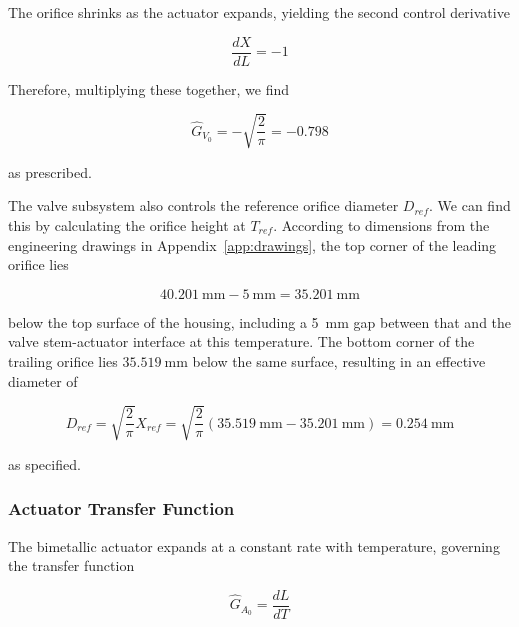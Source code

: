 \documentclass[12pt, letterpaper]{report}%
\newcounter{mycounter}           %
\newcounter{sub}[mycounter]      %
\newcommand{\AzeroExact}{\SI{0.254}{\milli\meter}}
\newcommand{\GV}{\num{-0.798}}
\begin{document}
				The orifice shrinks as the actuator expands, yielding the second control derivative

				\begin{equation}
					\frac{dX}{dL} = -1
				\end{equation}

				Therefore, multiplying these together, we find

				\begin{equation}
					\hat{G}_{V_0} = -\sqrt{\frac{2}{\pi}} = \GV
				\end{equation}

				as prescribed.

				The valve subsystem also controls the reference orifice diameter $D_{ref}$.
				We can find this by calculating the orifice height at $T_{ref}$.
				According to dimensions from the engineering drawings in Appendix~\ref{app:drawings}, the top corner of the leading orifice lies

				\begin{equation*}
					\SI{40.201}{\milli\meter} - \SI{5}{\milli\meter} = \SI{35.201}{\milli\meter}
				\end{equation*}

				below the top surface of the housing, including a \SI{5}{\milli\meter} gap between that and the valve stem-actuator interface at this temperature.
				The bottom corner of the trailing orifice lies $\SI{35.519}{\milli\meter}$ below the same surface, resulting in an effective diameter of

				\begin{equation}
					D_{ref} = \sqrt{\frac{2}{\pi}} X_{ref} = \sqrt{\frac{2}{\pi}} (\SI{35.519}{\milli\meter} - \SI{35.201}{\milli\meter}) = \AzeroExact
					\label{eq:Dref}
				\end{equation}

				as specified.

			\subsubsection{Actuator Transfer Function}
			\label{subsubsec:design:just:TF:act}

			The bimetallic actuator expands at a constant rate with temperature, governing the transfer function
			
			\begin{equation*}
				\hat{G}_{A_0} = \frac{dL}{dT}
			\end{equation*}
			
\end{document}
